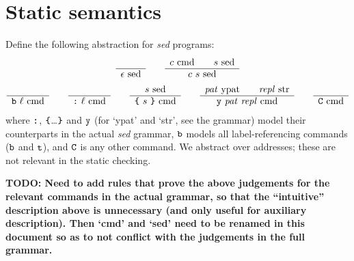 \documentclass[11pt]{article}
\newcommand\RULE[2]{\begin{array}{c} #1 \\ \hline #2 \end{array}}
\newcommand\SED{\emph{sed}}
\newcommand\J[1]{\ensuremath{\text{ #1}}}
\newcommand\cmd[1]{\ensuremath{\text{\texttt{#1}}}}
\renewcommand\arg[1]{\ensuremath{\mathit{#1}}}
\begin{document}
\section{Static semantics}

Define the following abstraction for \SED{} programs:
\begin{gather*}
	\RULE{}{\epsilon \J{sed}} \qquad
	\RULE{c \J{cmd} \qquad s \J{sed}}{c\ s \J{sed}} \\
	\RULE{}{\cmd{b}\ \arg{\ell} \J{cmd}} \qquad
	\RULE{}{\cmd{:}\ \arg{\ell} \J{cmd}} \qquad
	\RULE{s \J{sed}}{\cmd{\{}\ s\ \cmd{\}} \J{cmd}} \qquad
	\RULE{\arg{pat} \J{ypat} \qquad \arg{repl} \J{str}}{\cmd{y}\ \arg{pat}\ \arg{repl} \J{cmd}} \qquad
	\RULE{}{\cmd{C} \J{cmd}}
\end{gather*}
where \cmd{:}, \cmd{\{}\ldots\!\cmd{\}} and \cmd{y} (for `ypat' and `str', see the grammar) model their counterparts in the actual \SED{} grammar, \cmd{b} models all label-referencing commands (\cmd{b} and \cmd{t}), and \cmd{C} is any other command.
We abstract over addresses; these are not relevant in the static checking.

\textbf{TODO: Need to add rules that prove the above judgements for the relevant commands in the actual grammar, so that the ``intuitive'' description above is unnecessary (and only useful for auxiliary description). Then `cmd' and `sed' need to be renamed in this document so as to not conflict with the judgements in the full grammar.}
\end{document}
